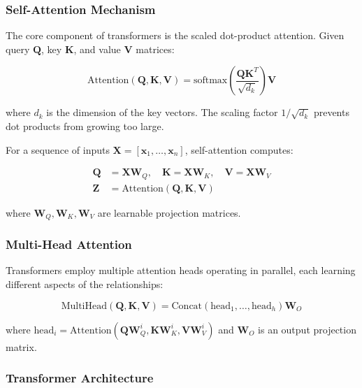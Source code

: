 \subsubsection{Self-Attention Mechanism}

The core component of transformers is the scaled dot-product attention. Given query $\mathbf{Q}$, key $\mathbf{K}$, and value $\mathbf{V}$ matrices:

\begin{equation}
\text{Attention}(\mathbf{Q}, \mathbf{K}, \mathbf{V}) = \text{softmax}\left(\frac{\mathbf{Q}\mathbf{K}^T}{\sqrt{d_k}}\right)\mathbf{V}
\end{equation}

where $d_k$ is the dimension of the key vectors. The scaling factor $1/\sqrt{d_k}$ prevents dot products from growing too large.

For a sequence of inputs $\mathbf{X} = [\mathbf{x}_1, \ldots, \mathbf{x}_n]$, self-attention computes:

\begin{align}
\mathbf{Q} &= \mathbf{X}\mathbf{W}_Q, \quad \mathbf{K} = \mathbf{X}\mathbf{W}_K, \quad \mathbf{V} = \mathbf{X}\mathbf{W}_V \\
\mathbf{Z} &= \text{Attention}(\mathbf{Q}, \mathbf{K}, \mathbf{V})
\end{align}

where $\mathbf{W}_Q, \mathbf{W}_K, \mathbf{W}_V$ are learnable projection matrices.

\subsubsection{Multi-Head Attention}

Transformers employ multiple attention heads operating in parallel, each learning different aspects of the relationships:

\begin{equation}
\text{MultiHead}(\mathbf{Q}, \mathbf{K}, \mathbf{V}) = \text{Concat}(\text{head}_1, \ldots, \text{head}_h)\mathbf{W}_O
\end{equation}

where $\text{head}_i = \text{Attention}(\mathbf{Q}\mathbf{W}_Q^i, \mathbf{K}\mathbf{W}_K^i, \mathbf{V}\mathbf{W}_V^i)$ and $\mathbf{W}_O$ is an output projection matrix.

\subsubsection{Transformer Architecture}

